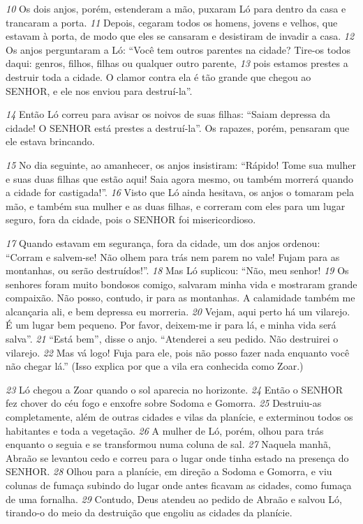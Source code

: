 \bigskip   
\textit{\tiny 10}
Os dois anjos, porém, estenderam a mão, puxaram Ló para dentro da casa e
trancaram a porta. 
\textit{\tiny 11}
Depois, cegaram todos os homens, jovens e velhos, que
estavam à porta, de modo que eles se cansaram e desistiram de invadir a casa.
\textit{\tiny 12}
Os anjos perguntaram a Ló: “Você tem outros parentes na cidade? Tire-os
todos daqui: genros, filhos, filhas ou qualquer outro parente, 
\textit{\tiny 13}
pois estamos
prestes a destruir toda a cidade. O clamor contra ela é tão grande que chegou ao
SENHOR, e ele nos enviou para destruí-la”.

\bigskip   
\textit{\tiny 14}
Então Ló correu para avisar os noivos de suas filhas: “Saiam depressa da
cidade! O SENHOR está prestes a destruí-la”. Os rapazes, porém, pensaram que ele
estava brincando.

\bigskip   
\textit{\tiny 15}
No dia seguinte, ao amanhecer, os anjos insistiram: “Rápido! Tome sua
mulher e suas duas filhas que estão aqui! Saia agora mesmo, ou também morrerá
quando a cidade for castigada!”.
\textit{\tiny 16}
Visto que Ló ainda hesitava, os anjos o tomaram pela mão, e também sua
mulher e as duas filhas, e correram com eles para um lugar seguro, fora da cidade,
pois o SENHOR foi misericordioso. 

\bigskip   
\textit{\tiny 17}
Quando estavam em segurança, fora da cidade, um dos anjos ordenou: “Corram e salvem-se! Não olhem para trás nem
parem no vale! Fujam para as montanhas, ou serão destruídos!”.
\textit{\tiny 18}
Mas Ló suplicou: “Não, meu senhor! 
\textit{\tiny 19}
Os senhores foram muito bondosos
comigo, salvaram minha vida e mostraram grande compaixão. Não posso,
contudo, ir para as montanhas. A calamidade também me alcançaria ali, e bem
depressa eu morreria. 
\textit{\tiny 20}
Vejam, aqui perto há um vilarejo. É um lugar bem
pequeno. Por favor, deixem-me ir para lá, e minha vida será salva”.
\textit{\tiny 21}
“Está bem”, disse o anjo. “Atenderei a seu pedido. Não destruirei o vilarejo.
\textit{\tiny 22}
Mas vá logo! Fuja para ele, pois não posso fazer nada enquanto você não chegar
lá.” (Isso explica por que a vila era conhecida como Zoar.)

\bigskip   
\textit{\tiny 23}
Ló chegou a Zoar quando o sol aparecia no horizonte. 
\textit{\tiny 24}
Então o SENHOR fez
chover do céu fogo e enxofre sobre Sodoma e Gomorra. 
\textit{\tiny 25}
Destruiu-as
completamente, além de outras cidades e vilas da planície, e exterminou todos os
habitantes e toda a vegetação. 
\textit{\tiny 26}
A mulher de Ló, porém, olhou para trás enquanto
o seguia e se transformou numa coluna de sal.
\textit{\tiny 27}
Naquela manhã, Abraão se levantou cedo e correu para o lugar onde tinha
estado na presença do SENHOR. 
\textit{\tiny 28}
Olhou para a planície, em direção a Sodoma e
Gomorra, e viu colunas de fumaça subindo do lugar onde antes ficavam as
cidades, como fumaça de uma fornalha.
\textit{\tiny 29}
Contudo, Deus atendeu ao pedido de Abraão e salvou Ló, tirando-o do meio
da destruição que engoliu as cidades da planície.


